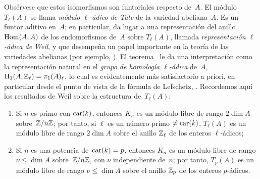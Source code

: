Obsérvese que estos isomorfismos son funtoriales respecto de~$A$. El módulo
$T_\ell(A)$ se llama \emph{módulo $\ell$-ádico de Tate} de la variedad
abeliana~$A$. Es un funtor aditivo en~$A$; en particular, da lugar a una
representación del anillo $\operatorname{Hom}(A,A)$ de los endomorfismos de~$A$ sobre
$T_\ell(A)$, llamada \emph{representación $\ell$-ádica de Weil}, y que
desempeña un papel importante en la teoría de las variedades abelianas
(\cf por ejemplo, \hbox{\cite[cap.~VII]{XI.4}}). El
teorema~ le da una interpretación como la representación
natural en el \emph{grupo de homología $\ell$-ádica} de~$A$,
$\mathrm H_1(A,\mathbb Z_\ell)=\pi_1(A)_\ell$, lo cual
es evidentemente más satisfactorio a priori, en particular desde el punto
de vista de la fórmula de Lefschetz, \cite[cap.~V]{XI.4}. Recordemos aquí
los resultados de Weil sobre la estructura de~$T_\ell(A)$:
\begin{enumerate}
\item[a)] Si $n$ es primo con $\operatorname{car}(k)$, entonces $K_n$ es un módulo libre
de rango $2\dim A$ sobre~$\mathbb Z/n\mathbb Z$; por tanto, si $\ell$ es un número
primo $\neq\operatorname{car}(k)$, $T_\ell(A)$ es un módulo libre de rango $2\dim A$
sobre el anillo $\mathbb Z_\ell$ de los enteros $\ell$-ádicos;
\item[b)] Si $n$ es una potencia de~$\operatorname{car}(k)=p$, entonces $K_n$ es un
módulo libre de rango $\nu\leq\dim A$ sobre~$\mathbb Z/n\mathbb Z$, con $\nu$
independiente de~$n$; por tanto, $T_p(A)$ es un módulo libre de rango
$\nu\leq\dim A$ sobre el anillo $\mathbb Z_p$ de los enteros $p$-ádicos.
\end{enumerate}

